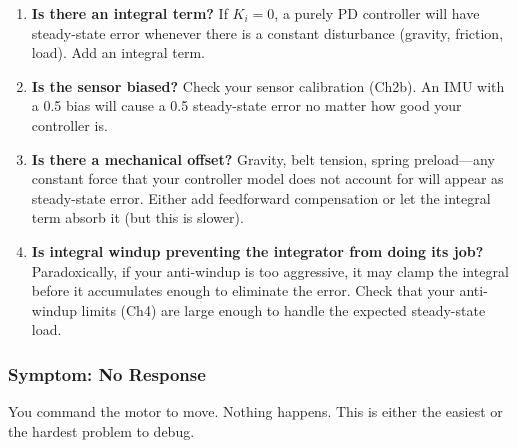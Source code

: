 \begin{enumerate}
    \item \textbf{Is there an integral term?} If $K_i = 0$, a purely PD controller will have steady-state error whenever there is a constant disturbance (gravity, friction, load). Add an integral term.

    \item \textbf{Is the sensor biased?} Check your sensor calibration (Ch2b). An IMU with a 0.5\textdegree{} bias will cause a 0.5\textdegree{} steady-state error no matter how good your controller is.

    \item \textbf{Is there a mechanical offset?} Gravity, belt tension, spring preload---any constant force that your controller model does not account for will appear as steady-state error. Either add feedforward compensation or let the integral term absorb it (but this is slower).

    \item \textbf{Is integral windup preventing the integrator from doing its job?} Paradoxically, if your anti-windup is too aggressive, it may clamp the integral before it accumulates enough to eliminate the error. Check that your anti-windup limits (Ch4) are large enough to handle the expected steady-state load.
\end{enumerate}

\subsubsection{Symptom: No Response}

You command the motor to move. Nothing happens. This is either the easiest or the hardest problem to debug.

